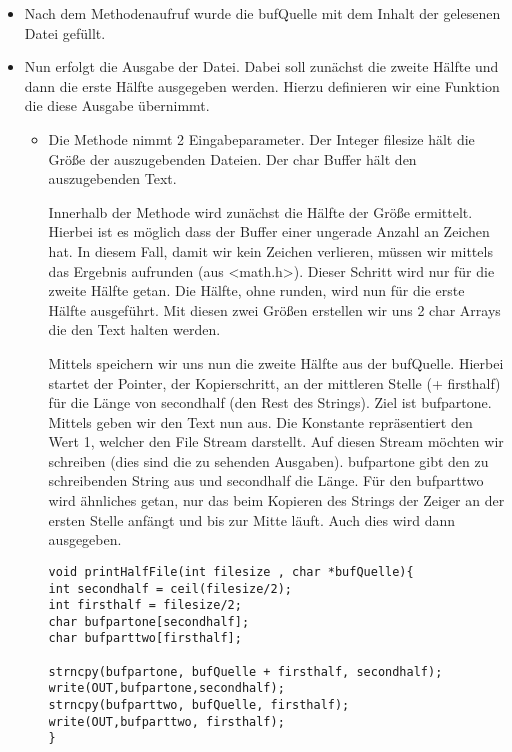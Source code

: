 \begin{itemize}
\begin{itemize}
\end{itemize}

\item Nach dem Methodenaufruf wurde die bufQuelle mit dem Inhalt der
gelesenen Datei gefüllt.

\item Nun erfolgt die Ausgabe der Datei. Dabei soll zunächst die zweite
Hälfte und dann die erste Hälfte ausgegeben werden.
Hierzu definieren wir eine Funktion die diese Ausgabe übernimmt.

\begin{itemize}
	\item Die Methode nimmt 2 Eingabeparameter.
	Der Integer filesize hält die Größe der auszugebenden
	Dateien.
	Der char Buffer hält den auszugebenden Text.

	Innerhalb der Methode wird zunächst die Hälfte der Größe ermittelt.
	Hierbei ist es möglich dass der Buffer einer ungerade Anzahl an
	Zeichen hat. In diesem Fall, damit wir kein Zeichen verlieren, müssen
	wir mittels  das Ergebnis aufrunden (aus <math.h>).
	Dieser Schritt wird nur für die zweite Hälfte getan.
	Die Hälfte, ohne runden, wird nun für die erste Hälfte ausgeführt.
	Mit diesen zwei Größen erstellen wir uns 2 char Arrays die den Text
	halten werden.

	Mittels  speichern wir uns nun die zweite Hälfte aus
	der bufQuelle. Hierbei startet der Pointer, der Kopierschritt, an der mittleren
	Stelle (+ firsthalf) für die Länge von secondhalf (den Rest des Strings).
	Ziel ist bufpartone.
	Mittels  geben wir den Text nun aus. Die Konstante
	 repräsentiert den Wert 1, welcher den 
	File Stream darstellt. Auf diesen Stream möchten wir schreiben (dies sind
	die zu sehenden Ausgaben). bufpartone gibt den zu schreibenden String aus und
	secondhalf die Länge.
	Für den bufparttwo wird ähnliches getan, nur das beim Kopieren des Strings
	der Zeiger an der ersten Stelle anfängt und bis zur Mitte läuft.
	Auch dies wird dann ausgegeben.

	\begin{lstlisting}
void printHalfFile(int filesize , char *bufQuelle){
int secondhalf = ceil(filesize/2);
int firsthalf = filesize/2;
char bufpartone[secondhalf];
char bufparttwo[firsthalf];

strncpy(bufpartone, bufQuelle + firsthalf, secondhalf);
write(OUT,bufpartone,secondhalf);
strncpy(bufparttwo, bufQuelle, firsthalf);
write(OUT,bufparttwo, firsthalf);
}
\end{lstlisting}


\end{itemize}
\end{itemize}
